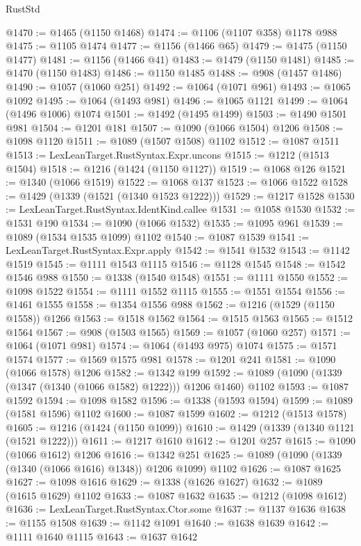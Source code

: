 \begin{lexlean}{RustStd}
\begin{coremodule}
@1470 := @1465 (@1150 @1468)
@1474 := @1106 (@1107 @358) @1178 @988
@1475 := @1105 @1474
@1477 := @1156 (@1466 @65)
@1479 := @1475 (@1150 @1477)
@1481 := @1156 (@1466 @41)
@1483 := @1479 (@1150 @1481)
@1485 := @1470 (@1150 @1483)
@1486 := @1150 @1485
@1488 := @908 (@1457 @1486)
@1490 := @1057 (@1060 @251)
@1492 := @1064 (@1071 @961)
@1493 := @1065 @1092
@1495 := @1064 (@1493 @981)
@1496 := @1065 @1121
@1499 := @1064 (@1496 @1006) @1074
@1501 := @1492 (@1495 @1499)
@1503 := @1490 @1501 @981
@1504 := @1201 @181
@1507 := @1090 (@1066 @1504) @1206
@1508 := @1098 @1120
@1511 := @1089 (@1507 @1508) @1102
@1512 := @1087 @1511
@1513 := LexLeanTarget.RustSyntax.Expr.uncons
@1515 := @1212 (@1513 @1504)
@1518 := @1216 (@1424 (@1150 @1127))
@1519 := @1068 @126
@1521 := @1340 (@1066 @1519)
@1522 := @1068 @137
@1523 := @1066 @1522
@1528 := @1429 (@1339 (@1521 (@1340 @1523 @1222)))
@1529 := @1217 @1528
@1530 := LexLeanTarget.RustSyntax.IdentKind.callee
@1531 := @1058 @1530
@1532 := @1531 @190
@1534 := @1090 (@1066 @1532)
@1535 := @1095 @961
@1539 := @1089 (@1534 @1535 @1099) @1102
@1540 := @1087 @1539
@1541 := LexLeanTarget.RustSyntax.Expr.apply
@1542 := @1541 @1532
@1543 := @1142 @1519
@1545 := @1111 @1543 @1115
@1546 := @1128 @1545
@1548 := @1542 @1546 @988
@1550 := @1338 (@1540 @1548)
@1551 := @1111 @1550
@1552 := @1098 @1522
@1554 := @1111 @1552 @1115
@1555 := @1551 @1554
@1556 := @1461 @1555
@1558 := @1354 @1556 @988
@1562 := @1216 (@1529 (@1150 @1558)) @1266
@1563 := @1518 @1562
@1564 := @1515 @1563
@1565 := @1512 @1564
@1567 := @908 (@1503 @1565)
@1569 := @1057 (@1060 @257)
@1571 := @1064 (@1071 @981)
@1574 := @1064 (@1493 @975) @1074
@1575 := @1571 @1574
@1577 := @1569 @1575 @981
@1578 := @1201 @241
@1581 := @1090 (@1066 @1578) @1206
@1582 := @1342 @199
@1592 := @1089 (@1090 (@1339 (@1347 (@1340 (@1066 @1582) @1222))) @1206 @1460) @1102
@1593 := @1087 @1592
@1594 := @1098 @1582
@1596 := @1338 (@1593 @1594)
@1599 := @1089 (@1581 @1596) @1102
@1600 := @1087 @1599
@1602 := @1212 (@1513 @1578)
@1605 := @1216 (@1424 (@1150 @1099))
@1610 := @1429 (@1339 (@1340 @1121 (@1521 @1222)))
@1611 := @1217 @1610
@1612 := @1201 @257
@1615 := @1090 (@1066 @1612) @1206
@1616 := @1342 @251
@1625 := @1089 (@1090 (@1339 (@1340 (@1066 @1616) @1348)) @1206 @1099) @1102
@1626 := @1087 @1625
@1627 := @1098 @1616
@1629 := @1338 (@1626 @1627)
@1632 := @1089 (@1615 @1629) @1102
@1633 := @1087 @1632
@1635 := @1212 (@1098 @1612)
@1636 := LexLeanTarget.RustSyntax.Ctor.some
@1637 := @1137 @1636
@1638 := @1155 @1508
@1639 := @1142 @1091
@1640 := @1638 @1639
@1642 := @1111 @1640 @1115
@1643 := @1637 @1642

\end{coremodule}
\end{lexlean}
